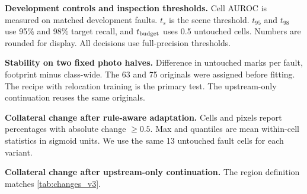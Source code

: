 \begin{table}[t]
\centering
\caption{\textbf{Development controls and inspection thresholds.} Cell AUROC is measured on matched development faults. $t_s$ is the scene threshold. $t_{95}$ and $t_{98}$ use 95\% and 98\% target recall, and $t_{\rm budget}$ uses 0.5 untouched cells. Numbers are rounded for display. All decisions use full-precision thresholds.}
\label{tab:thresholds_v3}
\scriptsize
\setlength{\tabcolsep}{3.5pt}

\end{table}

\begin{table}[t]
\centering
\caption{\textbf{Stability on two fixed photo halves.} Difference in untouched marks per fault, footprint minus class-wide. The 63 and 75 originals were assigned before fitting. The recipe with relocation training is the primary test. The upstream-only continuation reuses the same originals.}
\label{tab:halves_v3}
\scriptsize

\end{table}

\begin{table}[t]
\centering
\caption{\textbf{Collateral change after rule-aware adaptation.} Cells and pixels report percentages with absolute change $\geq0.5$. Max and quantiles are mean within-cell statistics in sigmoid units. We use the same 13 untouched fault cells for each variant.}
\label{tab:changes_v3}
\scriptsize
\setlength{\tabcolsep}{4pt}

\end{table}

\begin{table}[t]
\centering
\caption{\textbf{Collateral change after upstream-only continuation.} The region definition matches \cref{tab:changes_v3}.}
\label{tab:changes_upstream}
\scriptsize
\setlength{\tabcolsep}{4pt}

\end{table}
